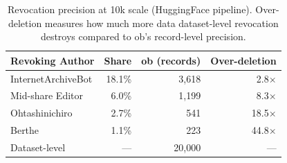 \begin{table}[b]
	\centering
	\small
	\caption{Revocation precision at 10k scale (HuggingFace pipeline). Over-deletion measures how much more data dataset-level revocation destroys compared to ob's record-level precision.}
	\label{tab:revocation}
	\setlength{\tabcolsep}{3.5pt}
	\begin{tabular}{@{}lrrr@{}}
		\toprule
		Revoking Author    & Share  & ob (records) & Over-deletion \\
		\midrule
		InternetArchiveBot & 18.1\% & 3,618        & 2.8$\times$   \\
		Mid-share Editor    & 6.0\%  & 1,199        & 8.3$\times$   \\
		Ohtashinichiro     & 2.7\%  & 541          & 18.5$\times$  \\
		Berthe              & 1.1\%  & 223          & 44.8$\times$  \\
		\midrule
		Dataset-level      & ---    & 20,000       & ---           \\
		\bottomrule
	\end{tabular}
\end{table}
